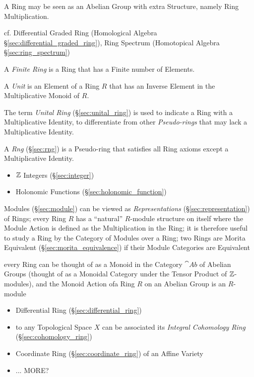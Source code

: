 A Ring may be seen as an Abelian Group with extra Structure, namely Ring
Multiplication.

cf. Differential Graded Ring (Homological Algebra
\S\ref{sec:differential_graded_ring}), Ring Spectrum (Homotopical Algebra
\S\ref{sec:ring_spectrum})

A \emph{Finite Ring} is a Ring that has a Finite number of Elements.

A \emph{Unit} is an Element of a Ring $R$ that has an Inverse
Element in the Multiplicative Monoid of $R$.

The term \emph{Unital Ring} (\S\ref{sec:unital_ring}) is used to
indicate a Ring with a Multiplicative Identity, to differentiate from
other \emph{Pseudo-rings} that may lack a Multiplicative Identity.

A \emph{Rng} (\S\ref{sec:rng}) is a Pseudo-ring that satisfies all
Ring axioms except a Multiplicative Identity.

\begin{itemize}
  \item $\mathbb{Z}$ Integers (\S\ref{sec:integer})
  \item Holonomic Functions (\S\ref{sec:holonomic_function})
\end{itemize}

\fist Modules (\S\ref{sec:module}) can be viewed as \emph{Representations}
(\S\ref{sec:representation}) of Rings; every Ring $R$ has a ``natural''
$R$-module structure on itself where the Module Action is defined as the
Multiplication in the Ring; it is therefore useful to study a Ring by the
Category of Modules over a Ring; two Rings are Morita Equivalent
(\S\ref{sec:morita_equivalence}) if their Module Categories are Equivalent

every Ring can be thought of as a Monoid in the Category $\cat{Ab}$ of Abelian
Groups (thought of as a Monoidal Category under the Tensor Product of
$\mathbb{Z}$-modules), and the Monoid Action ofa Ring $R$ on an Abelian Group is an
$R$-module

\begin{itemize}
  \item Differential Ring (\S\ref{sec:differential_ring})
  \item to any Topological Space $X$ can be associated its \emph{Integral
    Cohomology Ring} (\S\ref{sec:cohomology_ring})
  \item Coordinate Ring (\S\ref{sec:coordinate_ring}) of an Affine Variety
  \item ... MORE?
\end{itemize}

